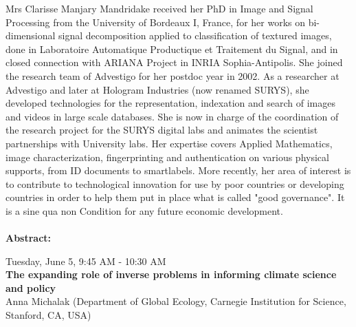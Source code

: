 Mrs Clarisse Manjary Mandridake received her PhD in Image and Signal Processing from the University of Bordeaux I, France, for her works on bi-dimensional signal decomposition applied to classification of textured images, done in Laboratoire Automatique Productique et Traitement du Signal, and in closed connection with ARIANA Project in INRIA Sophia-Antipolis. She joined the research team of Advestigo for her postdoc year in 2002. As a researcher at Advestigo and later at Hologram Industries (now renamed SURYS), she developed technologies for the representation, indexation and search of images and videos in large scale databases. She is now in charge of the coordination of the research project for the SURYS digital labs and animates the scientist partnerships with University labs. Her expertise covers Applied Mathematics, image characterization, fingerprinting and authentication on various physical supports, from ID documents to smartlabels.
More recently, her area of interest is to contribute to technological innovation for use by poor countries or developing countries in order to help them put in place what is called "good governance". It is a sine qua non Condition for any future economic development.  
\\\\

\textbf{Abstract:}\\

  


\newpage\vspace{2cm}
\begin{center}{\Large{
      Tuesday, June 5, 9:45 AM - 10:30 AM \\
      \textbf{The expanding role of inverse problems in informing climate science and policy}\\
      Anna Michalak (Department of Global Ecology, Carnegie Institution for Science, Stanford, CA, USA)  
}}
\end{center}
\vspace{1cm}

\begin{wrapfloat}{figure}{o}{0pt}
  \texttt{[image: \{images/speakers/michalak@carnegiescience.edu]}.jpg}
\end{wrapfloat}


